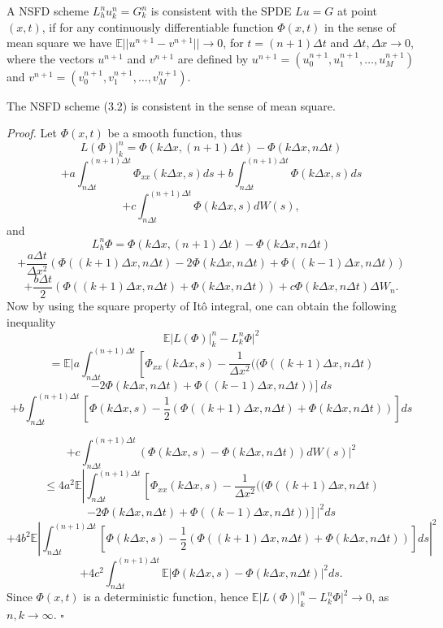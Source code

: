 \documentclass[twoside]{article}
\begin{document}
\begin{dfn} A NSFD scheme $L_h^n u_k^n = G_k^n$ is consistent with the SPDE $Lu = G$ at point $(x, t)$, if for any continuously differentiable function $\Phi(x,t)$ in the sense of mean square we have $\mathbb{E}||u^{n+1} - v^{n+1}|| \to 0$, for $t=(n+1)\Delta t$ and $\Delta t, \Delta x \to 0$, where the vectors $u^{n+1}$ and $v^{n+1}$ are defined by $u^{n+1} = (u_0^{n+1}, u_1^{n+1}, \dots, u_M^{n+1})$ and $v^{n+1} = (v_0^{n+1}, v_1^{n+1}, \dots, v_M^{n+1})$.
\end{dfn}
\begin{thm}
 The NSFD scheme (3.2) is consistent in the sense of mean square.
\end{thm}
\noindent \textit{Proof.} Let $\Phi(x,t)$ be a smooth function, thus
$$L(\Phi)|_k^n = \Phi(k\Delta x, (n+1)\Delta t) - \Phi(k\Delta x, n\Delta t)$$
$$ + a \int_{n\Delta t}^{(n+1)\Delta t} \Phi_{xx}(k\Delta x, s)ds + b \int_{n\Delta t}^{(n+1)\Delta t} \Phi(k\Delta x, s)ds $$
$$ + c \int_{n\Delta t}^{(n+1)\Delta t} \Phi(k\Delta x, s)dW(s), $$
and
$$L_h^n \Phi = \Phi(k\Delta x, (n+1)\Delta t) - \Phi(k\Delta x, n\Delta t)$$
$$+ \frac{a\Delta t}{\Delta x^2} (\Phi((k+1)\Delta x, n\Delta t) - 2\Phi(k\Delta x, n\Delta t) + \Phi((k-1)\Delta x, n\Delta t))$$
$$+ \frac{b\Delta t}{2} (\Phi((k+1)\Delta x, n\Delta t) + \Phi(k\Delta x, n\Delta t)) + c \Phi(k\Delta x, n\Delta t)\Delta W_n.$$
Now by using the square property of Itô integral, one can obtain the following inequality
$$\mathbb{E}|L(\Phi)|_k^n - L_k^n \Phi|^2$$
$$ = \mathbb{E}|a\int_{n\Delta t}^{(n+1)\Delta t} \left[\Phi_{xx}(k\Delta x, s) - \frac{1}{\Delta x^2}((\Phi((k+1)\Delta x, n\Delta t) \right.$$
$$ \left. - 2\Phi(k\Delta x, n\Delta t) + \Phi((k-1)\Delta x, n\Delta t)) \right]ds$$
$$ + b\int_{n\Delta t}^{(n+1)\Delta t} \left[\Phi(k\Delta x, s) - \frac{1}{2}(\Phi((k+1)\Delta x, n\Delta t) + \Phi(k\Delta x, n\Delta t)) \right]ds $$


$$+ c \int_{n\Delta t}^{(n+1)\Delta t} (\Phi(k\Delta x, s) - \Phi(k\Delta x, n\Delta t))dW(s)|^2$$
$$\le 4a^2 \mathbb{E} \left|\int_{n\Delta t}^{(n+1)\Delta t} \left[\Phi_{xx}(k\Delta x, s) - \frac{1}{\Delta x^2}((\Phi((k+1)\Delta x, n\Delta t) \right.\right.$$
$$ \left.\left. - 2\Phi(k\Delta x, n\Delta t) + \Phi((k-1)\Delta x, n\Delta t))\right]\right|^2 ds$$
$$+ 4b^2 \mathbb{E} \left|\int_{n\Delta t}^{(n+1)\Delta t} \left[\Phi(k\Delta x, s) - \frac{1}{2}(\Phi((k+1)\Delta x, n\Delta t) + \Phi(k\Delta x, n\Delta t))\right]ds\right|^2 $$
$$+ 4c^2 \int_{n\Delta t}^{(n+1)\Delta t} \mathbb{E}|\Phi(k\Delta x, s) - \Phi(k\Delta x, n\Delta t)|^2 ds.$$
Since $\Phi(x,t)$ is a deterministic function, hence $\mathbb{E}|L(\Phi)|_k^n - L_k^n \Phi|^2 \to 0$, as $n, k \to \infty$. \hfill $\square$
\end{document}
